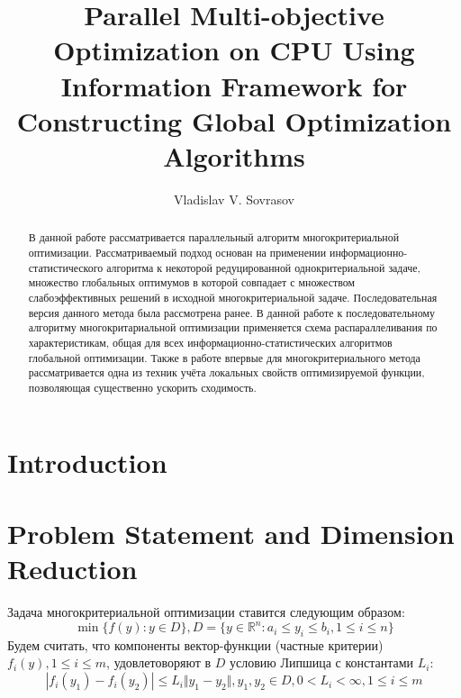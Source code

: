 \documentclass{llncs}
\begin{document}
%
\mainmatter              %
%
\title{Parallel Multi-objective Optimization on CPU Using Information Framework for Constructing Global Optimization Algorithms}
%
%
\author{Vladislav V. Sovrasov}
%
%
%

\maketitle              %

\begin{abstract}
В данной работе рассматривается параллельный алгоритм многокритериальной оптимизации. Рассматриваемый подход основан на применении информационно-статистического алгоритма к некоторой редуцированной однокритериальной задаче, множество глобальных оптимумов в которой совпадает с множеством слабоэффективных решений в исходной многокритериальной задаче. Последовательная версия данного метода была рассмотрена ранее. В данной работе к последовательному алгоритму многокритариальной оптимизации применяется схема распараллеливания по характеристикам, общая для всех информационно-статистических алгоритмов глобальной оптимизации. Также в работе впервые для многокритериального метода рассматривается одна из техник учёта локальных свойств оптимизируемой функции, позволяющая существенно ускорить сходимость.

\end{abstract}
%
\section{Introduction}
\section{Problem Statement and Dimension Reduction}
Задача многокритериальной оптимизации ставится следующим образом:
\begin{equation}
  \label{eq:problem}
  \min\{f(y): y\in D\}, D=\{y\in \mathbb{R}^n: a_i \leqslant y_i \leqslant b_i, 1\leqslant i \leqslant n \}
\end{equation}
Будем считать, что компоненты вектор-функции (частные критерии) \(f_i(y), 1\leqslant i\leqslant m\), удовлетоворяют в \(D\) условию Липшица с константами \(L_i\):
\begin{displaymath}
\label{lip}
|f_i(y_1)-f_i(y_2)|\leqslant L_i\Vert y_1-y_2\Vert,y_1,y_2\in D,0<L_i<\infty,1\leqslant i \leqslant m
\end{displaymath}
\end{document}
